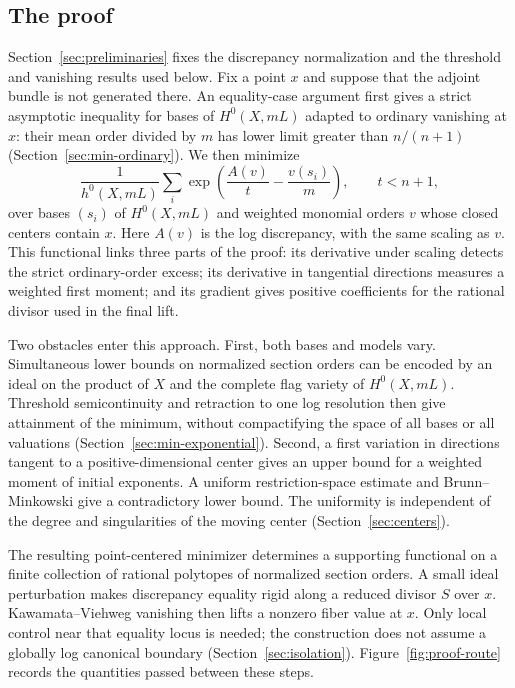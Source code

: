 \documentclass[11pt]{article}
\numberwithin{equation}{section}
\theoremstyle{definition}
\theoremstyle{remark}
\newcommand{\A}{A}
\begin{document}
\subsection*{The proof} 
Section~\ref{sec:preliminaries} fixes the discrepancy normalization and
the threshold and vanishing results used below.
Fix a point $x$ and suppose that the adjoint bundle is not generated
there. An equality-case argument first gives a strict asymptotic
inequality for bases of $H^0(X,mL)$ adapted to ordinary vanishing at $x$:
their mean order divided by $m$ has lower limit greater than $n/(n+1)$
(Section~\ref{sec:min-ordinary}). We then minimize
\[
 \frac{1}{h^0(X,mL)}\sum_i
 \exp\!\left(\frac{\A(v)}{t}-\frac{v(s_i)}m\right),
 \qquad t<n+1,
\]
over bases $(s_i)$ of $H^0(X,mL)$ and weighted monomial orders $v$ whose
closed centers contain $x$. Here $\A(v)$ is the log discrepancy, with
the same scaling as $v$. This functional links three parts of the
proof: its derivative under scaling detects the strict ordinary-order
excess; its derivative in tangential directions measures a weighted
first moment; and its gradient gives positive coefficients for the
rational divisor used in the final lift.

Two obstacles enter this approach. First, both bases and models vary.
Simultaneous lower bounds on normalized section
orders can be encoded by an ideal on the product of $X$ and the complete
flag variety of $H^0(X,mL)$.
Threshold semicontinuity and retraction to one log resolution then give
attainment of the minimum, without compactifying the space of all
bases or all valuations (Section~\ref{sec:min-exponential}). Second,
a first variation in directions
tangent to a positive-dimensional center gives an upper bound for a
weighted moment of initial exponents. A uniform restriction-space
estimate and Brunn--Minkowski give a contradictory lower bound. The
uniformity is independent of the degree and singularities of the
moving center (Section~\ref{sec:centers}).

The resulting point-centered minimizer determines a supporting
functional on a finite collection of rational polytopes of normalized
section orders. A small ideal perturbation makes discrepancy equality
rigid along a reduced divisor $S$ over $x$. Kawamata--Viehweg vanishing
then lifts a nonzero fiber value at $x$. Only local control near that equality locus is
needed; the construction does not assume a globally log canonical
boundary (Section~\ref{sec:isolation}). Figure~\ref{fig:proof-route}
records the quantities passed between these steps.
\end{document}
